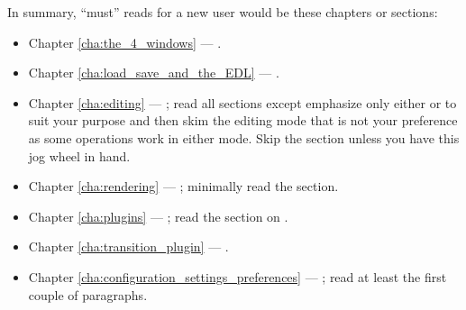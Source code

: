 In summary, “must” reads for a new user would be these chapters or sections:

\begin{itemize}
    \item Chapter \ref{cha:the_4_windows} --- .
    \item Chapter \ref{cha:load_save_and_the_EDL} --- .
    \item Chapter \ref{cha:editing} --- ; read all sections except emphasize only either  or  to suit your purpose and then skim the editing mode that is not your preference as some operations work in either mode. 
        Skip the  section unless you have this jog wheel in hand.
    \item Chapter \ref{cha:rendering} --- ; minimally read the  section.
    \item Chapter \ref{cha:plugins} --- ; read the section on .
    \item Chapter \ref{cha:transition_plugin} --- .
    \item Chapter \ref{cha:configuration_settings_preferences} --- ; read at least the first couple of paragraphs.
\end{itemize}


